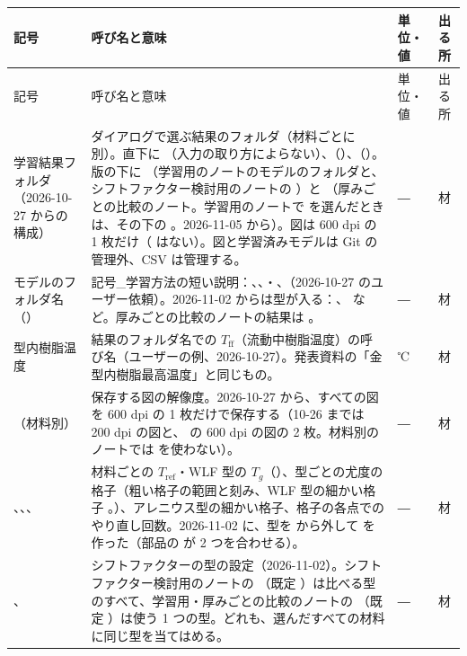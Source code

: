 \documentclass[paper=a4paper,fontsize=10.5pt,line_length=44zw,number_of_lines=38]{jlreq}
\makeatletter
\newcommand{\file}[1]{\texttt{\detokenize{#1}}}
\newcommand{\Tff}{T_{\mathrm{ff}}}
\newenvironment{symtab}{%
  \begin{longtable}{@{}>{\raggedright\arraybackslash}p{6.5\zw}>{\raggedright\arraybackslash}p{22\zw}>{\raggedright\arraybackslash}p{6\zw}>{\raggedright\arraybackslash}p{4.5\zw}@{}}
  \toprule 記号 & 呼び名と意味 & 単位・値 & 出る所 \\ \midrule \endfirsthead
  \toprule 記号 & 呼び名と意味 & 単位・値 & 出る所 \\ \midrule \endhead
  \bottomrule \endlastfoot}{\end{longtable}}
\makeatother
\begin{document}
\begin{symtab}
学習結果フォルダ（2026-10-27 からの構成） & ダイアログで選ぶ結果のフォルダ（材料ごとに別）。直下に \file{データ確認/}（入力の取り方によらない）、\file{全ショット版/}（\file{INPUT_MODE = "shot"}）、\file{条件ごとの平均版/}（\file{"cond"}）。版の下に \file{全厚み総合/}（学習用のノートのモデルのフォルダと、シフトファクター検討用のノートの \file{シフトファクターの検討/}）と \file{厚みごと/}（厚みごとの比較のノート。学習用のノートで \file{THICKNESS} を選んだときは、その下の \file{厚み<厚み>mm/<モデルのフォルダ>/}。2026-11-05 から）。図は 600 dpi の 1 枚だけ（\file{highres/} はない）。図と学習済みモデルは Git の管理外、CSV は管理する。 & ― & 材 \\
モデルのフォルダ名（\file{MODEL_DIRS}） & 記号\_学習方法の短い説明：\file{B_Tset_温度シフトに加熱シリンダ温度採用}、\file{B_Tff_温度シフトに型内樹脂温度採用}、\file{A_Tset_縦だけの温度シフトに加熱シリンダ温度採用}・\file{A_Tff_縦だけの温度シフトに型内樹脂温度採用}、\file{C_温度シフトなし}（2026-10-27 のユーザー依頼）。2026-11-02 からは型が入る：\file{B_Tset_Arr_アレニウス型の温度シフトに加熱シリンダ温度採用}、\file{B_Tff_WLF_WLF型の温度シフトに型内樹脂温度採用} など。厚みごとの比較のノートの結果は \file{厚みごと/<型>/}。 & ― & 材 \\
型内樹脂温度 & 結果のフォルダ名での $\Tff$（流動中樹脂温度）の呼び名（ユーザーの例、2026-10-27）。発表資料の「金型内樹脂最高温度」と同じもの。 & ℃ & 材 \\
\file{FIG_DPI}（材料別） & 保存する図の解像度。2026-10-27 から、すべての図を 600 dpi の 1 枚だけで保存する（10-26 までは 200 dpi の図と、\file{highres/} の 600 dpi の図の 2 枚。材料別のノートでは \file{HR_ALL} を使わない）。 & ― & 材 \\
\file{SHIFT_CFG}、\file{FORM_CFG}、\file{FINE_B}、\file{PROFILE_RESTARTS} & 材料ごとの $T_{\mathrm{ref}}$・WLF 型の $T_g$（\file{SHIFT_CFG}）、型ごとの尤度の格子（粗い格子の範囲と刻み、WLF 型の細かい格子 \file{"fine"}。\file{FORM_CFG}）、アレニウス型の細かい格子、格子の各点でのやり直し回数。2026-11-02 に、型を \file{SHIFT_CFG} から外して \file{FORM_CFG} を作った（部品の \file{shift_cfg(mat, form)} が 2 つを合わせる）。 & ― & 材 \\
\file{SHIFT_FORMS}、\file{SHIFT_FORM} & シフトファクターの型の設定（2026-11-02）。シフトファクター検討用のノートの \file{SHIFT_FORMS}（既定 \file{["arrhenius", "wlf"]}）は比べる型のすべて、学習用・厚みごとの比較のノートの \file{SHIFT_FORM}（既定 \file{"arrhenius"}）は使う 1 つの型。どれも、選んだすべての材料に同じ型を当てはめる。 & ― & 材 \\

\end{symtab}
\end{document}
